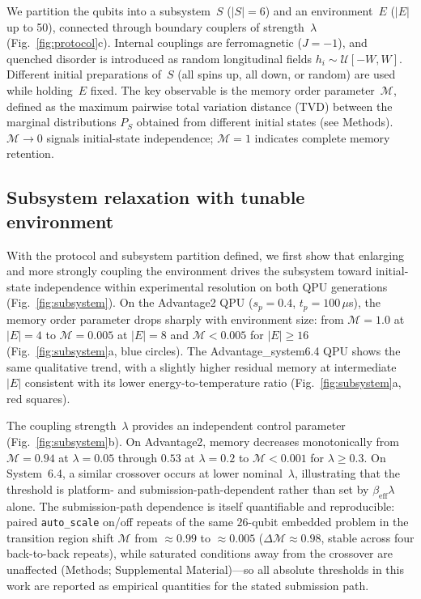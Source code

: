 \documentclass[aps,prapplied,reprint,superscriptaddress,floatfix,nofootinbib]{revtex4-2}
\begin{document}
We partition the qubits into a subsystem~$S$ ($|S|=6$) and an environment~$E$ ($|E|$ up to 50), connected through boundary couplers of strength~$\lambda$ (Fig.~\ref{fig:protocol}c).
Internal couplings are ferromagnetic ($J=-1$), and quenched disorder is introduced as random longitudinal fields $h_i\sim\mathcal{U}[-W,W]$.
Different initial preparations of~$S$ (all spins up, all down, or random) are used while holding~$E$ fixed.
The key observable is the memory order parameter~$\mathcal{M}$, defined as the maximum pairwise total variation distance (TVD) between the marginal distributions $P_S$ obtained from different initial states (see Methods).
$\mathcal{M}\to 0$ signals initial-state independence; $\mathcal{M}= 1$ indicates complete memory retention.

\subsection{Subsystem relaxation with tunable environment}

With the protocol and subsystem partition defined, we first show that enlarging and more strongly coupling the environment drives the subsystem toward initial-state independence within experimental resolution on both QPU generations (Fig.~\ref{fig:subsystem}).
On the Advantage2 QPU ($s_p=0.4$, $t_p=100\,\mu$s), the memory order parameter drops sharply with environment size: from $\mathcal{M}=1.0$ at $|E|=4$ to $\mathcal{M}=0.005$ at $|E|=8$ and $\mathcal{M}<0.005$ for $|E|\geq 16$ (Fig.~\ref{fig:subsystem}a, blue circles).
The Advantage\_system6.4 QPU shows the same qualitative trend, with a slightly higher residual memory at intermediate~$|E|$ consistent with its lower energy-to-temperature ratio (Fig.~\ref{fig:subsystem}a, red squares).

The coupling strength~$\lambda$ provides an independent control parameter (Fig.~\ref{fig:subsystem}b).
On Advantage2, memory decreases monotonically from $\mathcal{M}=0.94$ at $\lambda=0.05$ through $0.53$ at $\lambda=0.2$ to $\mathcal{M}<0.001$ for $\lambda\geq 0.3$.
On System~6.4, a similar crossover occurs at lower nominal~$\lambda$, illustrating that the threshold is platform- and submission-path-dependent rather than set by $\beta_\mathrm{eff}\lambda$ alone.
The submission-path dependence is itself quantifiable and reproducible: paired \texttt{auto\_scale} on/off repeats of the same $26$-qubit embedded problem in the transition region shift $\mathcal{M}$ from $\approx 0.99$ to $\approx 0.005$ ($\Delta\mathcal{M}\approx 0.98$, stable across four back-to-back repeats), while saturated conditions away from the crossover are unaffected (Methods; Supplemental Material)---so all absolute thresholds in this work are reported as empirical quantities for the stated submission path.
\end{document}
